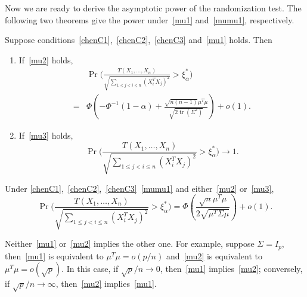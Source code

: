 \documentclass[smallcondensed,final,natbib]{svjour3}          %
\DeclareMathOperator{\mytr}{tr}
\begin{document}
Now we are ready to derive the asymptotic power of the randomization test.
The following two theorems give the power under~\eqref{mu1} and~\eqref{mumu1}, respectively.

\begin{theorem}\label{theoremPower}
    Suppose conditions~\eqref{chenC1},~\eqref{chenC2},~\eqref{chenC3} and~\eqref{mu1} holds. Then
    \begin{enumerate}
        \item
    If~\eqref{mu2} holds,
    \begin{equation}\label{oPower}
        \begin{aligned}
            &\Pr\Big(\frac{T( X_1,\ldots, X_n)}{\sqrt{\sum_{1\leq j<i\leq n}{(X_i^T X_j)}^2}}>\xi_{\alpha}^* \Big)\\
            =&
            \Phi(-\Phi^{-1}(1-\alpha)+\frac{\sqrt{n(n-1)}\mu^T\mu}{\sqrt{2\mytr (\Sigma^2)}})+o(1).
        \end{aligned}
    \end{equation}
\item
    If~\eqref{mu3} holds,
    \begin{equation*}
            \Pr\Big(\frac{T( X_1,\ldots, X_n)}{\sqrt{\sum_{1\leq j<i\leq n}{(X_i^T X_j)}^2}}>\xi_{\alpha}^* \Big)\to 1.
    \end{equation*}
    \end{enumerate}
\end{theorem}

\begin{theorem}\label{theoremPower2}
    Under \eqref{chenC1},~\eqref{chenC2},~\eqref{chenC3}~\eqref{mumu1} and either~\eqref{mu2} or~\eqref{mu3},
    \begin{equation*}
            \Pr\Big(\frac{T( X_1,\ldots, X_n)}{\sqrt{\sum_{1\leq j<i\leq n}{(X_i^T X_j)}^2}}>\xi_{\alpha}^* \Big)
            =
            \Phi(\frac{\sqrt{n}\mu^T\mu}{2\sqrt{\mu^T \Sigma \mu}})+o(1).
    \end{equation*}
\end{theorem}

\begin{remark}
    Neither~\eqref{mu1} or~\eqref{mu2} implies the other one.
    For example, suppose $\Sigma=I_p$, then~\eqref{mu1} is equivalent to $\mu^T\mu=o(p/n)$ and~\eqref{mu2} is equivalent to $\mu^T \mu =o(\sqrt{p})$.
    In this case, if $\sqrt{p}/n\to 0$, then~\eqref{mu1} implies~\eqref{mu2}; conversely, if $\sqrt{p}/n\to \infty$, then~\eqref{mu2} implies~\eqref{mu1}.
\end{remark}
\end{document}
